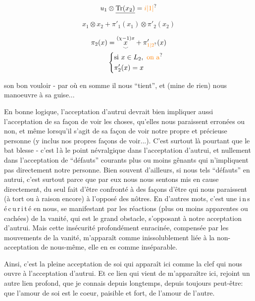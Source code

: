 \[u_1\otimes\underline{\mathrm{Tr}(x_2)}=\unsure{i|1|}\]

\[\boxed{x_1\otimes x_2+\pi'_1(x_1)\otimes\pi'_2(x_2)}\]

\[
\begin{aligned}
\pi_2(x)&=\overset{(\chi-1)x}{\underset{\smile}{x}}+\pi'_{\unsure{1|2}}(x)\\
&\left\{\begin{aligned}&\text{si }x\in L_2,\ \unsure{\text{on a}}\\&\pi'_2(x)=x\end{aligned}\right.
\end{aligned}
\]

son bon vouloir - par où en somme il nous ``tient'', et (mine de rien) nous manoeuvre à sa guise...

En bonne logique, l'acceptation d'autrui devrait bien impliquer aussi l'acceptation de sa façon de voir les choses, qu'elles nous paraissent erronées ou non, et même lorsqu'il s'agit de sa façon de voir notre propre et précieuse personne (y inclus nos propres façons de voir...). C'est surtout là pourtant que le bat blesse - c'est l\,à le point névralgique dans l'acceptation d'autrui, et nullement dans l'acceptation de ``défauts'' courants plus ou moins gênants qui n'impliquent pas directement notre personne. Bien souvent d'ailleurs, si nous  tels ``défauts'' en autrui, c'est surtout parce que par eux nous nous sentons mis en cause directement, du seul fait d'être confronté à des façons d'être qui nous paraissent (à tort ou à raison encore) à l'opposé des nôtres. En d'autres mots, c'est une i\,n\,s\,é\,c\,u\,r\,i\,t\,é en nous, se manifestant par les réactions (plus ou moins apparentes ou cachées) de la vanité, qui est le grand obstacle, s'opposant à notre acceptation d'autrui. Mais cette insécurité profondément enracinée, compensée par les mouvements de la vanité, m'apparaît comme inissolublement liée à la non-acceptation de nous-même, elle en es comme  inséparable.

Ainsi, c'est la pleine acceptation de soi qui apparaît ici comme la clef qui nous ouvre à l'acceptation d'autrui. Et ce lien qui vient de m'apparaître ici, rejoint un autre lien profond, que je connais depuis longtemps, depuis toujours peut-être: que l'amour de soi est le coeur, paisible et fort, de l'amour de l'autre.

